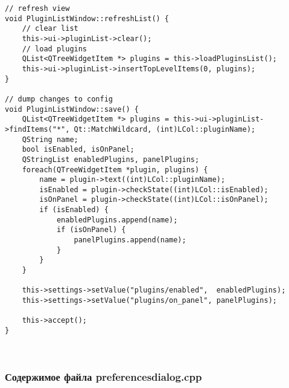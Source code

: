 \begin{lstlisting}
// refresh view
void PluginListWindow::refreshList() {
    // clear list
    this->ui->pluginList->clear();
    // load plugins
    QList<QTreeWidgetItem *> plugins = this->loadPluginsList();
    this->ui->pluginList->insertTopLevelItems(0, plugins);
}

// dump changes to config
void PluginListWindow::save() {
    QList<QTreeWidgetItem *> plugins = this->ui->pluginList->findItems("*", Qt::MatchWildcard, (int)LCol::pluginName);
    QString name;
    bool isEnabled, isOnPanel;
    QStringList enabledPlugins, panelPlugins;
    foreach(QTreeWidgetItem *plugin, plugins) {
        name = plugin->text((int)LCol::pluginName);
        isEnabled = plugin->checkState((int)LCol::isEnabled);
        isOnPanel = plugin->checkState((int)LCol::isOnPanel);
        if (isEnabled) {
            enabledPlugins.append(name);
            if (isOnPanel) {
                panelPlugins.append(name);
            }
        }
    }

    this->settings->setValue("plugins/enabled",  enabledPlugins);
    this->settings->setValue("plugins/on_panel", panelPlugins);

    this->accept();
}
\end{lstlisting}~\\

\subsubsection*{Содержимое файла preferencesdialog.cpp}

